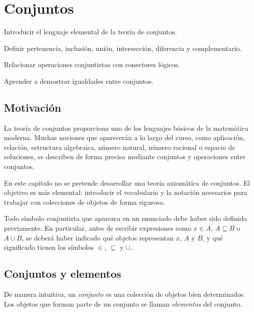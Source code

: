 \chapter{Conjuntos}

\begin{objetivos}
  \item Introducir el lenguaje elemental de la teoría de conjuntos.
  \item Definir pertenencia, inclusión, unión, intersección, diferencia y complementario.
  \item Relacionar operaciones conjuntistas con conectores lógicos.
  \item Aprender a demostrar igualdades entre conjuntos.
\end{objetivos}

\section{Motivación}

La teoría de conjuntos proporciona uno de los lenguajes básicos de la matemática moderna. Muchas nociones que aparecerán a lo largo del curso, como aplicación, relación, estructura algebraica, número natural, número racional o espacio de soluciones, se describen de forma precisa mediante conjuntos y operaciones entre conjuntos.

En este capítulo no se pretende desarrollar una teoría axiomática de conjuntos. El objetivo es más elemental: introducir el vocabulario y la notación necesarios para trabajar con colecciones de objetos de forma rigurosa.

\begin{convencion}
Todo símbolo conjuntista que aparezca en un enunciado debe haber sido definido previamente. En particular, antes de escribir expresiones como \(x\in A\), \(A\subseteq B\) o \(A\cup B\), se deberá haber indicado qué objetos representan \(x\), \(A\) y \(B\), y qué significado tienen los símbolos \(\in\), \(\subseteq\) y \(\cup\).
\end{convencion}

\section{Conjuntos y elementos}

De manera intuitiva, un \emph{conjunto} es una colección de objetos bien determinados. Los objetos que forman parte de un conjunto se llaman \emph{elementos} del conjunto.

